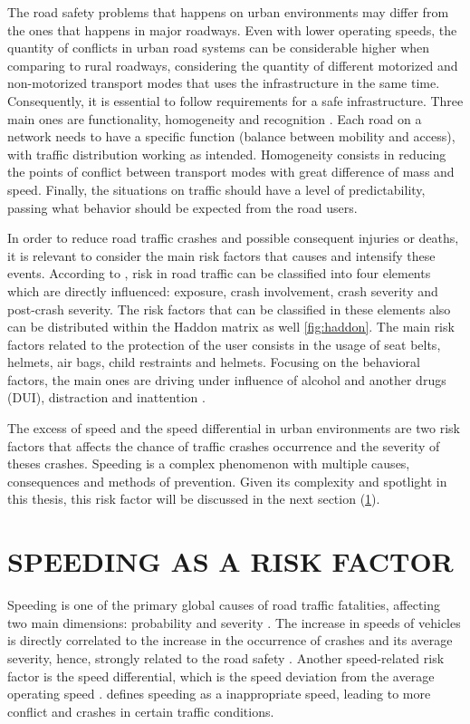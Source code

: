 The road safety problems that happens on urban environments may differ from the ones that happens in major roadways. Even with lower operating speeds, the quantity of conflicts in urban road systems can be considerable higher when comparing to rural roadways, considering the quantity of different motorized and non-motorized transport modes that uses the infrastructure in the same time. Consequently, it is essential to follow requirements for a safe infrastructure. Three main ones are functionality, homogeneity and recognition \cite{SWOV2003}. Each road on a network needs to have a specific function (balance between mobility and access), with traffic distribution working as intended. Homogeneity consists in reducing the points of conflict between transport modes with great difference of mass and speed. Finally, the situations on traffic should have a level of predictability, passing what behavior should be expected from the road users.

In order to reduce road traffic crashes and possible consequent injuries or deaths, it is relevant to consider the main risk factors that causes and intensify these events. According to \textcite{WHO2004}, risk in road traffic can be classified into four elements which are directly influenced: exposure, crash involvement, crash severity and post-crash severity. The risk factors that can be classified in these elements also can be distributed within the Haddon matrix as well \autoref{fig:haddon}. The main risk factors related to the protection of the user consists in the usage of seat belts, helmets, air bags, child restraints and helmets. Focusing on the behavioral factors, the main ones are driving under influence of alcohol and another drugs (DUI), distraction and inattention \cite{Shinar2017}.

The excess of speed and the speed differential in urban environments are two risk factors that affects the chance of traffic crashes occurrence and the severity of theses crashes. Speeding is a complex phenomenon with multiple causes, consequences and methods of prevention. Given its complexity and spotlight in this thesis, this risk factor will be discussed in the next section (\ref{speeding}). 

\section{SPEEDING AS A RISK FACTOR} \label{speeding}

Speeding is one of the primary global causes of road traffic fatalities, affecting two main dimensions: probability and severity \cite{WHO2013}. The increase in speeds of vehicles is directly correlated to the increase in the occurrence of crashes and its average severity, hence, strongly related to the road safety \cite{Mohan2016a}. Another speed-related risk factor is the speed differential, which is the speed deviation from the average operating speed \cite{Shinar2017}. \textcite{Ferraz2012} defines speeding as a inappropriate speed, leading to more conflict and crashes in certain traffic conditions. 

